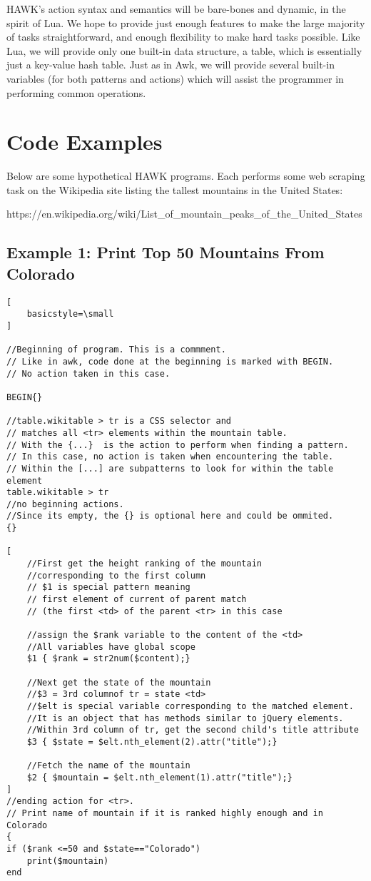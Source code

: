 \documentclass[12pt]{article}
\begin{document}
HAWK's action syntax and semantics will be bare-bones and dynamic, in the spirit of Lua. We hope to provide just enough features to make the large majority of tasks straightforward, and enough flexibility to make hard tasks possible. Like Lua, we will provide only one built-in data structure, a table, which is essentially just a key-value hash table. Just as in Awk, we will provide several built-in variables (for both patterns and actions) which will assist the programmer in performing common operations.

\section*{Code Examples}

Below are some hypothetical HAWK programs. Each performs some web scraping task on the Wikipedia site listing the tallest mountains in the United States:

https://en.wikipedia.org/wiki/List\_of\_mountain\_peaks\_of\_the\_United\_States

\subsection*{Example 1: Print Top 50 Mountains From Colorado}

\begin{lstlisting}[
    basicstyle=\small
]

//Beginning of program. This is a commment.
// Like in awk, code done at the beginning is marked with BEGIN.
// No action taken in this case.

BEGIN{}

//table.wikitable > tr is a CSS selector and 
// matches all <tr> elements within the mountain table.
// With the {...}  is the action to perform when finding a pattern.
// In this case, no action is taken when encountering the table.
// Within the [...] are subpatterns to look for within the table element
table.wikitable > tr 
//no beginning actions. 
//Since its empty, the {} is optional here and could be ommited.
{} 

[
	//First get the height ranking of the mountain 
	//corresponding to the first column
	// $1 is special pattern meaning 
	// first element of current of parent match 
	// (the first <td> of the parent <tr> in this case
	
	//assign the $rank variable to the content of the <td>
	//All variables have global scope
	$1 { $rank = str2num($content);}
	
	//Next get the state of the mountain
	//$3 = 3rd columnof tr = state <td>
	//$elt is special variable corresponding to the matched element. 
	//It is an object that has methods similar to jQuery elements.
	//Within 3rd column of tr, get the second child's title attribute
	$3 { $state = $elt.nth_element(2).attr("title");}
	
	//Fetch the name of the mountain
	$2 { $mountain = $elt.nth_element(1).attr("title");}
]
//ending action for <tr>. 
// Print name of mountain if it is ranked highly enough and in Colorado
{
if ($rank <=50 and $state=="Colorado")
	print($mountain)
end
\end{lstlisting}
\end{document}
